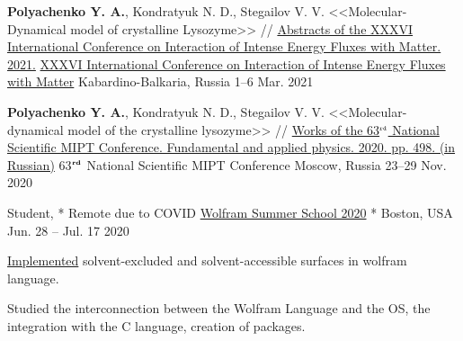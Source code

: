 

    

\begin{cventries}

  \cventry
    {\textbf{Polyachenko Y. A.}, Kondratyuk N. D., Stegailov V. V. <<Molecular-Dynamical model of crystalline Lysozyme>> // \href{http://www.ihed.ras.ru/elbrus21/program/restore.php?id=154}{Abstracts of the XXXVI International Conference on Interaction of Intense Energy Fluxes with Matter. 2021.}} %
    {\href{http://www.ihed.ras.ru/elbrus21/}{XXXVI International Conference on Interaction of Intense Energy Fluxes with Matter}} %
    {Kabardino-Balkaria, Russia} %
    {1--6 Mar. 2021} %
    {}
    

  \cventry
    {\textbf{Polyachenko Y. A.}, Kondratyuk N. D., Stegailov V. V. <<Molecular-dynamical model of the crystalline lysozyme>> // \href{https://mipt.ru/science/5top100/education/courseproposal/\%D0\%A4\%D0\%A4\%D0\%9F\%D0\%A4.pdf\#page=499}{Works of the 63$^{\texttt{\tiny rd}}$ National Scientific MIPT Conference. Fundamental and applied physics. 2020. pp. 498. (in Russian)}} %
    {63$^{\textbf{\tiny rd}}$ National Scientific MIPT Conference} %
    {Moscow, Russia} %
    {23--29 Nov. 2020} %
    {}
    

  \cventry
    {Student, * Remote due to COVID} %
    {\href{https://education.wolfram.com/summer/school/}{Wolfram Summer School 2020}} %
    {* Boston, USA} %
    {Jun. 28 -- Jul. 17 2020} %
    {
      \begin{cvitems} %
        \item {\href{https://community.wolfram.com/groups/-/m/t/2029621}{Implemented} solvent-excluded and solvent-accessible surfaces in wolfram language.}      
        \item {Studied the interconnection between the Wolfram Language and the OS, the integration with the C language, creation of packages.}
      \end{cvitems}
    }


\end{cventries}
